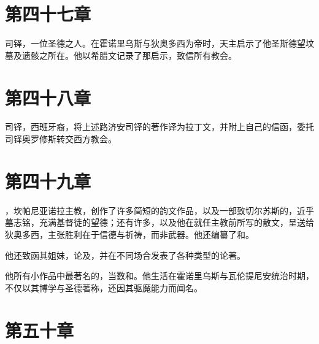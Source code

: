 
\section{第四十七章}

司铎，一位圣德之人。在霍诺里乌斯与狄奥多西为帝时，天主启示了他圣斯德望坟墓及遗骸之所在。他以希腊文记录了那启示，致信所有教会。\par


\section{第四十八章}

司铎，西班牙裔，将上述路济安司铎的著作译为拉丁文，并附上自己的信函，委托司铎奥罗修斯转交西方教会。\par


\section{第四十九章}

，坎帕尼亚诺拉主教，创作了许多简短的韵文作品，以及一部致切尔苏斯的，近乎墓志铭，充满基督徒的望德；还有许多，以及他在就任主教前所写的散文，呈送给狄奥多西，主张胜利在于信德与祈祷，而非武器。他还编纂了和。\par

他还致函其姐妹，论及，并在不同场合发表了各种类型的论著。\par

他所有小作品中最著名的，当数和。他生活在霍诺里乌斯与瓦伦提尼安统治时期，不仅以其博学与圣德著称，还因其驱魔能力而闻名。\par


\section{第五十章}

